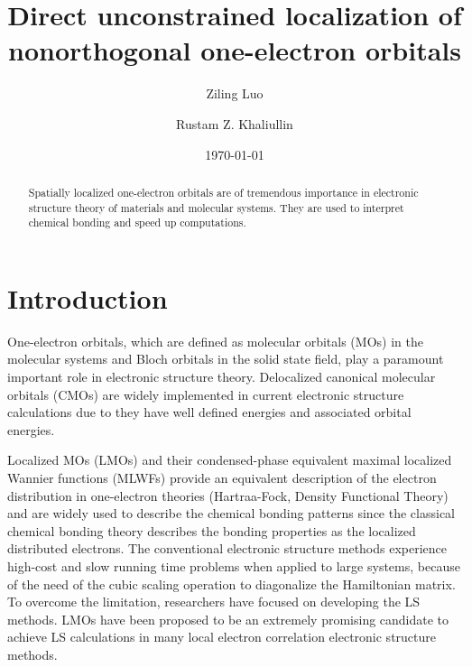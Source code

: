 \documentclass[aps,prl,reprint,amsmath,amssymb]{revtex4-1}
\begin{document}



\title{
Direct unconstrained localization of nonorthogonal one-electron orbitals
}

\author{Ziling Luo}
\author{Rustam Z. Khaliullin}

\date{\today}

\begin{abstract}
Spatially localized one-electron orbitals are of tremendous importance in electronic structure theory of materials and molecular systems. 
They are used to interpret chemical bonding and speed up computations. 
\end{abstract}

\maketitle

\section{Introduction} 

One-electron orbitals, which are defined as molecular orbitals (MOs) in the molecular systems and Bloch orbitals in the solid state field, play a paramount important role in electronic structure theory. 
Delocalized canonical molecular orbitals (CMOs) are widely implemented in current electronic structure calculations due to they have well defined energies and associated orbital energies. 

Localized MOs (LMOs) and their condensed-phase equivalent maximal localized Wannier functions (MLWFs) provide an equivalent description of the electron distribution in one-electron theories (Hartraa-Fock, Density Functional Theory) and are widely used to describe the chemical bonding patterns since the classical chemical bonding theory describes the bonding properties as the localized distributed electrons.
The conventional electronic structure methods experience high-cost and slow running time problems when applied to large systems, because of the need of the cubic scaling operation to diagonalize the Hamiltonian matrix.
To overcome the limitation, researchers have focused on developing the LS methods.
LMOs have been proposed to be an extremely promising candidate to achieve LS calculations in many local electron correlation electronic structure methods.~\cite{wang1992simple, ordejon1993unconstrained, mauri1993orbital, mauri1994electronic, stechel1994n_scaling, goedecker1994efficient}
\end{document}
